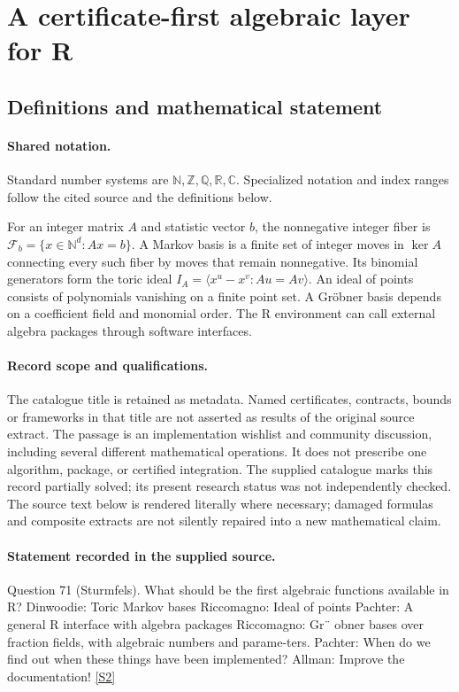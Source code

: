 \documentclass[11pt]{article}
\newcommand{\sref}[2]{\hyperlink{source:#1:#2}{[S#2]}}
\begin{document}
\section{A certificate-first algebraic layer for R}\label{statement}

\subsection{Definitions and mathematical statement}

\paragraph{Shared notation.}Standard number systems are $\mathbb N,\mathbb Z,\mathbb Q,\mathbb R,\mathbb C$. Specialized notation and index ranges follow the cited source and the definitions below.


For an integer matrix $A$ and statistic vector $b$, the nonnegative integer fiber is $\mathcal F_b=\{x\in\mathbb N^d:Ax=b\}$. A Markov basis is a finite set of integer moves in $\ker A$ connecting every such fiber by moves that remain nonnegative. Its binomial generators form the toric ideal $I_A=\langle x^u-x^v:Au=Av\rangle$. An ideal of points consists of polynomials vanishing on a finite point set. A Gröbner basis depends on a coefficient field and monomial order. The R environment can call external algebra packages through software interfaces.
\paragraph{Record scope and qualifications.}
The catalogue title is retained as metadata. Named certificates, contracts, bounds or frameworks in that title are not asserted as results of the original source extract.
The passage is an implementation wishlist and community discussion, including several different mathematical operations. It does not prescribe one algorithm, package, or certified integration. The supplied catalogue marks this record partially solved; its present research status was not independently checked.
The source text below is rendered literally where necessary; damaged formulas and composite extracts are not silently repaired into a new mathematical claim.
\paragraph{Statement recorded in the supplied source.}
Question 71 (Sturmfels). What should be the first algebraic functions available in R? Dinwoodie: Toric Markov bases Riccomagno: Ideal of points Pachter: A general R interface with algebra packages Riccomagno: Gr¨ obner bases over fraction fields, with algebraic numbers and parame-ters. Pachter: When do we find out when these things have been implemented? Allman: Improve the documentation! \sref{statement}{2}
\end{document}
